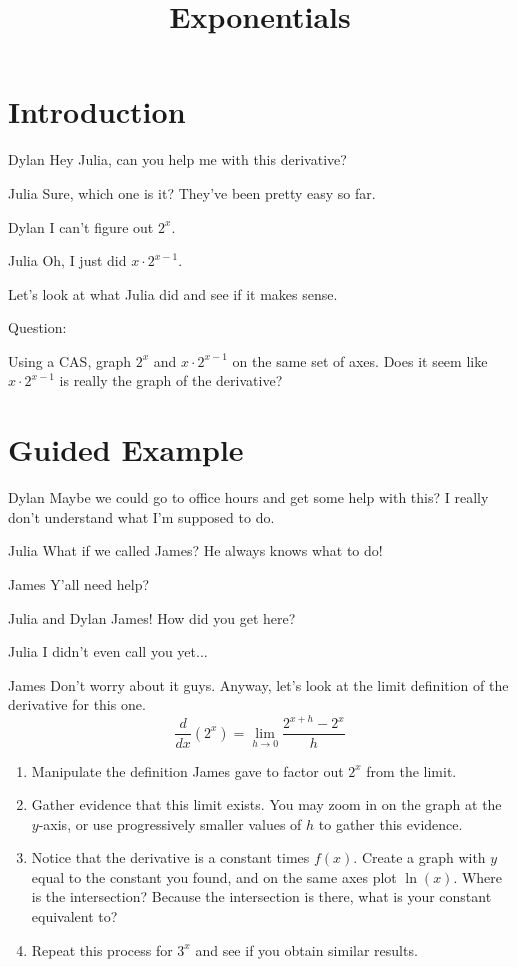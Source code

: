 \documentclass{ximera}
\title{Exponentials}
\begin{document}
\maketitle
\section{Introduction}
\begin{dialogue}
\item[Dylan] Hey Julia, can you help me with this derivative?
\item[Julia] Sure, which one is it? They've been pretty easy so far.
\item[Dylan] I can't figure out $2^x$.
\item[Julia] Oh, I just did $x \cdot 2^{x-1}$.
\end{dialogue}
Let's look at what Julia did and see if it makes sense.

Question:

Using a CAS, graph $2^x$ and $x \cdot 2^{x-1}$ on the same set of axes. Does it seem like $x \cdot 2^{x-1}$ is really the graph of the derivative?

\section{Guided Example}
\begin{dialogue}
\item[Dylan] Maybe we could go to office hours and get some help with this? I really don't understand what I'm supposed to do.
\item[Julia] What if we called James? He always knows what to do!
\item[James] Y'all need help?
\item[Julia and Dylan] James! How did you get here?
\item[Julia] I didn't even call you yet...
\item[James] Don't worry about it guys. Anyway, let's look at the limit definition of the derivative for this one. $$\dfrac{d}{dx}(2^x)=\lim_{h \to 0} \dfrac{2^{x+h}-2^x}{h}$$
\end{dialogue}

\begin{enumerate}
\item Manipulate the definition James gave to factor out $2^x$ from the limit.
\item Gather evidence that this limit exists. You may zoom in on the graph at the $y$-axis, or use progressively smaller values of $h$ to gather this evidence.
\item Notice that the derivative is a constant times $f(x)$. Create a graph with $y$ equal to the constant you found, and on the same axes plot $\ln \left(x\right)$. Where is the intersection? Because the intersection is there, what is your constant equivalent to?
\item Repeat this process for $3^x$ and see if you obtain similar results.
\end{enumerate}
\end{document}
